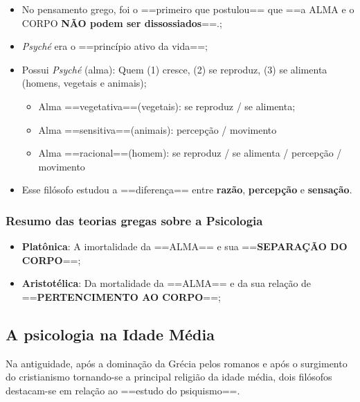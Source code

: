 \documentclass[
]{book}
\providecommand{\tightlist}{%
  \setlength{\itemsep}{0pt}\setlength{\parskip}{0pt}}
\theoremstyle{definition}
\theoremstyle{definition}
\theoremstyle{definition}
\theoremstyle{definition}
\theoremstyle{remark}
\begin{document}
\begin{itemize}
\tightlist
\item
  No pensamento grego, foi o ==primeiro que postulou== que ==a ALMA e o CORPO \textbf{NÃO podem ser dissossiados}==.;
\item
  \emph{Psyché} era o ==princípio ativo da vida==;
\item
  Possui \emph{Psyché} (alma): Quem (1) cresce, (2) se reproduz, (3) se alimenta (homens, vegetais e animais);

  \begin{itemize}
  \tightlist
  \item
    Alma ==vegetativa==(vegetais): se reproduz / se alimenta;
  \item
    Alma ==sensitiva==(animais): percepção / movimento
  \item
    Alma ==racional==(homem): se reproduz / se alimenta / percepção / movimento
  \end{itemize}
\item
  Esse filósofo estudou a ==diferença== entre \textbf{razão}, \textbf{percepção} e \textbf{sensação}.
\end{itemize}

\hypertarget{resumo-das-teorias-gregas-sobre-a-psicologia}{%
\subsubsection*{Resumo das teorias gregas sobre a Psicologia}\label{resumo-das-teorias-gregas-sobre-a-psicologia}}

\begin{itemize}
\tightlist
\item
  \textbf{Platônica}: A imortalidade da ==ALMA== e sua ==\textbf{SEPARAÇÃO DO CORPO}==;
\item
  \textbf{Aristotélica}: Da mortalidade da ==ALMA== e da sua relação de ==\textbf{PERTENCIMENTO AO CORPO}==;
\end{itemize}

\hypertarget{a-psicologia-na-idade-muxe9dia}{%
\subsection*{A psicologia na Idade Média}\label{a-psicologia-na-idade-muxe9dia}}

Na antiguidade, após a dominação da Grécia pelos romanos e após o surgimento do cristianismo tornando-se a principal religião da idade média, dois filósofos destacam-se em relação ao ==estudo do psiquismo==.
\end{document}
